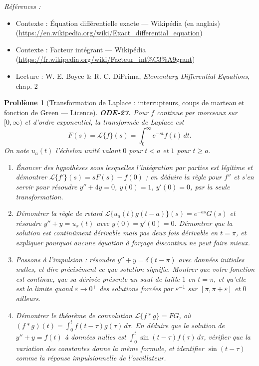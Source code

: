 \documentclass[11pt]{article}
\newtheorem{problem}{Problème}
\newenvironment{refs}{\par\small\noindent\emph{Références :}\begin{itemize}\setlength\itemsep{0pt}}{\end{itemize}\normalsize}
\begin{document}
\begin{refs}
\item Contexte : Équation différentielle exacte --- Wikipédia (en anglais) (\url{https://en.wikipedia.org/wiki/Exact_differential_equation})
\item Contexte : Facteur intégrant --- Wikipédia (\url{https://fr.wikipedia.org/wiki/Facteur_int%C3%A9grant})
\item Lecture : W. E. Boyce \& R. C. DiPrima, \textit{Elementary Differential Equations}, chap. 2
\end{refs}

\bigskip

\begin{problem}[{Transformation de Laplace : interrupteurs, coups de marteau et fonction de Green --- Licence}]
\textbf{ODE-27.} Pour $ f $ continue par morceaux sur $ [0,\infty) $ et d'ordre
exponentiel, la transformée de Laplace est
\[ F(s) = \mathcal{L}\{f\}(s) = \int_0^{\infty} e^{-st} f(t)\,dt . \]
On note $ u_a(t) $ l'échelon unité valant $ 0 $ pour $ t <a $ et $ 1 $ pour
$ t \ge a $.
\begin{enumerate}
\item[(a)] Énoncer des hypothèses sous lesquelles l'intégration par parties est légitime et démontrer
$ \mathcal{L}\{f'\}(s) = sF(s) - f(0) $ ; en déduire la règle pour $ f'' $ et s'en servir pour
résoudre $ y'' + 4y = 0 $, $ y(0) = 1 $, $ y'(0) = 0 $, par la seule transformation.
\item[(b)] Démontrer la règle de retard $ \mathcal{L}\{u_a(t)g(t-a)\}(s) = e^{-as}G(s) $ et résoudre
$ y'' + y = u_{\pi}(t) $ avec $ y(0) = y'(0) = 0 $. Démontrer que la solution est continûment
dérivable mais pas deux fois dérivable en $ t = \pi $, et expliquer pourquoi aucune équation à
forçage discontinu ne peut faire mieux.
\item[(c)] Passons à l'impulsion : résoudre $ y'' + y = \delta(t - \pi) $ avec données initiales
nulles, et dire précisément ce que \og{} solution \fg{} signifie. Montrer que votre fonction est continue,
que sa dérivée présente un saut de taille $ 1 $ en $ t = \pi $, et qu'elle est la limite
quand $ \varepsilon \to 0^{+} $ des solutions forcées par $ \varepsilon^{-1} $ sur
$ [\pi, \pi + \varepsilon] $ et $ 0 $ ailleurs.
\item[(d)] Démontrer le théorème de convolution $ \mathcal{L}\{f * g\} = FG $, où
$ (f*g)(t) = \int_0^t f(t - \tau)g(\tau)\,d\tau $. En déduire que la solution de
$ y'' + y = f(t) $ à données nulles est $ \int_0^t \sin(t - \tau) f(\tau)\,d\tau $, vérifier
que la variation des constantes donne la même formule, et identifier $ \sin(t - \tau) $ comme la
réponse impulsionnelle de l'oscillateur.
\end{enumerate}

\end{problem}
\end{document}
